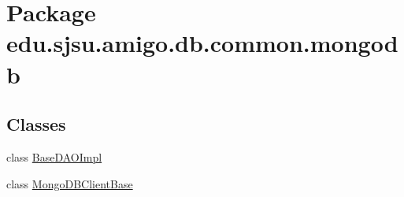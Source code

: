 \hypertarget{namespaceedu_1_1sjsu_1_1amigo_1_1db_1_1common_1_1mongodb}{}\section{Package edu.\+sjsu.\+amigo.\+db.\+common.\+mongodb}
\label{namespaceedu_1_1sjsu_1_1amigo_1_1db_1_1common_1_1mongodb}
\subsection*{Classes}
\begin{DoxyCompactItemize}
\item 
class \hyperlink{classedu_1_1sjsu_1_1amigo_1_1db_1_1common_1_1mongodb_1_1_base_d_a_o_impl}{Base\+D\+A\+O\+Impl}
\item 
class \hyperlink{classedu_1_1sjsu_1_1amigo_1_1db_1_1common_1_1mongodb_1_1_mongo_d_b_client_base}{Mongo\+D\+B\+Client\+Base}
\end{DoxyCompactItemize}
